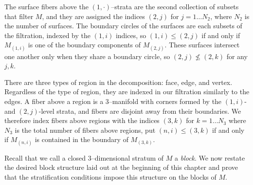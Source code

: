 The surface fibers above the $(1,\cdot)$--strata are the second collection of subsets that filter $M$, and they are assigned the indices $(2,j)$ for $j=1\dots N_2$, where $N_2$ is the number of surfaces.
The boundary circles of the surfaces are each subsets of the filtration, indexed by the $(1,i)$ indices, so $(1,i)\leq (2,j)$ if and only if $M_{(1,i)}$ is one of the boundary components of $M_{(2,j)}$.
These surfaces intersect one another only when they share a boundary circle, so $(2,j)\nleq (2,k)$ for any $j,k$.

There are three types of region in the decomposition: face, edge, and vertex.
Regardless of the type of region, they are indexed in our filtration similarly to the edges.
A fiber above a region is a 3--manifold with corners formed by the $(1,i)$- and $(2,j)$-level strata, and fibers are disjoint away from their boundaries.
We therefore index fibers above regions with the indices $(3,k)$ for $k=1\dots N_3$ where $N_3$ is the total number of fibers above regions, put $(n,i)\leq (3,k)$ if and only if $M_{(n,i)}$ is contained in the boundary of $M_{(3,k)}$.

Recall that we call a closed 3--dimensional stratum of $M$ a \emph{block}.
We now restate the desired block structure laid out at the beginning of this chapter and prove that the stratification conditions impose this structure on the blocks of $M$.

